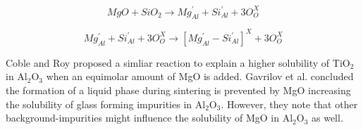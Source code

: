 \begin{equation}
\label{Ch1-eq: eq1}
MgO + SiO_{2} \rightarrow Mg_{Al}^{'} + Si_{Al}^{'} + 3O_{O}^{X}
\end{equation}

\begin{equation}
\label{Ch1-eq: eq1}
Mg_{Al}^{'} + Si_{Al}^{'} + 3O_{O}^{X} \rightarrow \left[ Mg_{Al}^{'} - Si_{Al}^{'} \right]^{X} + 3O_{O}^{X}
\end{equation}

Coble and Roy \cite{Roy1968} proposed a simliar reaction to explain a higher solubility of TiO$_{2}$ in Al$_{2}$O$_{3}$ when an equimolar amount of MgO is added. Gavrilov et al. \cite{Gavrilov1999} concluded the formation of a liquid phase during sintering is prevented by MgO increasing the solubility of glass forming impurities in Al$_{2}$O$_{3}$. However, they note that other background-impurities might influence the solubility of MgO in Al$_{2}$O$_{3}$ as well.

